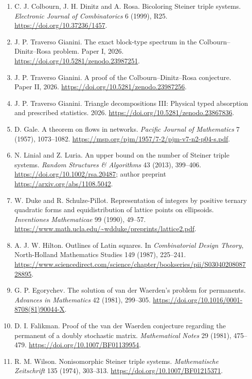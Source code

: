 \documentclass[english,11pt,a4paper]{article}
\providecommand{\tightlist}{\setlength{\itemsep}{0pt}\setlength{\parskip}{0pt}}
\begin{document}
\begin{enumerate}
\def\labelenumi{\arabic{enumi}.}
\tightlist
\item
  C. J. Colbourn, J. H. Dinitz and A. Rosa. Bicoloring Steiner triple systems. \emph{Electronic Journal of Combinatorics} 6 (1999), R25. \url{https://doi.org/10.37236/1457}.
\item
  J. P. Traverso Gianini. The exact block-type spectrum in the Colbourn--Dinitz--Rosa problem. Paper I, 2026. \url{https://doi.org/10.5281/zenodo.23987251}.
\item
  J. P. Traverso Gianini. A proof of the Colbourn--Dinitz--Rosa conjecture. Paper II, 2026. \url{https://doi.org/10.5281/zenodo.23987256}.
\item
  J. P. Traverso Gianini. Triangle decompositions III: Physical typed absorption and prescribed statistics. 2026. \url{https://doi.org/10.5281/zenodo.23867836}.
\item
  D. Gale. A theorem on flows in networks. \emph{Pacific Journal of Mathematics} 7 (1957), 1073--1082. \url{https://msp.org/pjm/1957/7-2/pjm-v7-n2-p04-s.pdf}.
\item
  N. Linial and Z. Luria. An upper bound on the number of Steiner triple systems. \emph{Random Structures \& Algorithms} 43 (2013), 399--406. \url{https://doi.org/10.1002/rsa.20487}; author preprint \url{https://arxiv.org/abs/1108.5042}.
\item
  W. Duke and R. Schulze-Pillot. Representation of integers by positive ternary quadratic forms and equidistribution of lattice points on ellipsoids. \emph{Inventiones Mathematicae} 99 (1990), 49--57. \url{https://www.math.ucla.edu/~wdduke/preprints/lattice2.pdf}.
\item
  A. J. W. Hilton. Outlines of Latin squares. In \emph{Combinatorial Design Theory}, North-Holland Mathematics Studies 149 (1987), 225--241. \url{https://www.sciencedirect.com/science/chapter/bookseries/pii/S0304020808728895}.
\item
  G. P. Egorychev. The solution of van der Waerden's problem for permanents. \emph{Advances in Mathematics} 42 (1981), 299--305. \url{https://doi.org/10.1016/0001-8708(81)90044-X}.
\item
  D. I. Falikman. Proof of the van der Waerden conjecture regarding the permanent of a doubly stochastic matrix. \emph{Mathematical Notes} 29 (1981), 475--479. \url{https://doi.org/10.1007/BF01139954}.
\item
  R. M. Wilson. Nonisomorphic Steiner triple systems. \emph{Mathematische Zeitschrift} 135 (1974), 303--313. \url{https://doi.org/10.1007/BF01215371}.

\end{enumerate}
\end{document}
